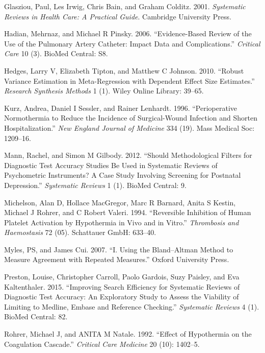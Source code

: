 \documentclass[smallextended]{svjour3}       %
\begin{document}
\leavevmode\hypertarget{ref-glasziou2001systematic}{}%
Glasziou, Paul, Les Irwig, Chris Bain, and Graham Colditz. 2001.
\emph{Systematic Reviews in Health Care: A Practical Guide}. Cambridge
University Press.

\leavevmode\hypertarget{ref-hadian2006evidence}{}%
Hadian, Mehrnaz, and Michael R Pinsky. 2006. ``Evidence-Based Review of
the Use of the Pulmonary Artery Catheter: Impact Data and
Complications.'' \emph{Critical Care} 10 (3). BioMed Central: S8.

\leavevmode\hypertarget{ref-hedges2010robust}{}%
Hedges, Larry V, Elizabeth Tipton, and Matthew C Johnson. 2010. ``Robust
Variance Estimation in Meta-Regression with Dependent Effect Size
Estimates.'' \emph{Research Synthesis Methods} 1 (1). Wiley Online
Library: 39--65.

\leavevmode\hypertarget{ref-kurz1996perioperative}{}%
Kurz, Andrea, Daniel I Sessler, and Rainer Lenhardt. 1996.
``Perioperative Normothermia to Reduce the Incidence of Surgical-Wound
Infection and Shorten Hospitalization.'' \emph{New England Journal of
Medicine} 334 (19). Mass Medical Soc: 1209--16.

\leavevmode\hypertarget{ref-mann2012should}{}%
Mann, Rachel, and Simon M Gilbody. 2012. ``Should Methodological Filters
for Diagnostic Test Accuracy Studies Be Used in Systematic Reviews of
Psychometric Instruments? A Case Study Involving Screening for Postnatal
Depression.'' \emph{Systematic Reviews} 1 (1). BioMed Central: 9.

\leavevmode\hypertarget{ref-michelson1994reversible}{}%
Michelson, Alan D, Hollace MacGregor, Marc R Barnard, Anita S Kestin,
Michael J Rohrer, and C Robert Valeri. 1994. ``Reversible Inhibition of
Human Platelet Activation by Hypothermia in Vivo and in Vitro.''
\emph{Thrombosis and Haemostasis} 72 (05). Schattauer GmbH: 633--40.

\leavevmode\hypertarget{ref-myles2007using}{}%
Myles, PS, and James Cui. 2007. ``I. Using the Bland--Altman Method to
Measure Agreement with Repeated Measures.'' Oxford University Press.

\leavevmode\hypertarget{ref-preston2015improving}{}%
Preston, Louise, Christopher Carroll, Paolo Gardois, Suzy Paisley, and
Eva Kaltenthaler. 2015. ``Improving Search Efficiency for Systematic
Reviews of Diagnostic Test Accuracy: An Exploratory Study to Assess the
Viability of Limiting to Medline, Embase and Reference Checking.''
\emph{Systematic Reviews} 4 (1). BioMed Central: 82.

\leavevmode\hypertarget{ref-rohrer1992effect}{}%
Rohrer, Michael J, and ANITA M Natale. 1992. ``Effect of Hypothermia on
the Coagulation Cascade.'' \emph{Critical Care Medicine} 20 (10):
1402--5.
\end{document}
